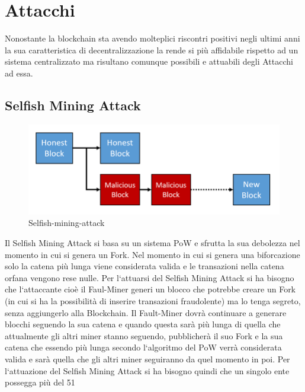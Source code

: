 \documentclass[12pt,titlepage]{report}
\begin{document}
\section{Attacchi}
Nonostante la blockchain sta avendo molteplici riscontri positivi negli ultimi anni la sua caratteristica di decentralizzazione la rende si più affidabile rispetto ad un sistema centralizzato ma risultano comunque possibili e attuabili degli Attacchi ad essa.

\subsection{Selfish Mining Attack}
\begin{figure}[h]
	\includegraphics[width=\textwidth]{Selfish-mining-attack}
	\centering
	\caption{Selfish-mining-attack}
	\label{fig:SM-attack}
\end{figure}
Il Selfish Mining Attack si basa su un sistema PoW e sfrutta la sua debolezza nel momento in cui si genera un Fork. Nel momento in cui si genera una biforcazione solo la catena più lunga viene considerata valida e le transazioni nella catena orfana vengono rese nulle. Per l`attuarsi del Selfish Mining Attack si ha bisogno che l`attaccante cioè il Faul-Miner generi un blocco che potrebbe creare un Fork (in cui si ha la possibilità di inserire transazioni fraudolente) ma lo tenga segreto, senza aggiungerlo alla Blockchain. Il Fault-Miner dovrà continuare a generare blocchi seguendo la sua catena e quando questa sarà più lunga di quella che attualmente gli altri miner stanno seguendo, pubblicherà il suo Fork e la sua catena che essendo più lunga secondo l`algoritmo del PoW verrà considerata valida e sarà quella che gli altri miner seguiranno da quel momento in poi. Per l`attuazione del Selfish Mining Attack si ha bisogno quindi che un singolo ente possegga più del 51%
\end{document}
